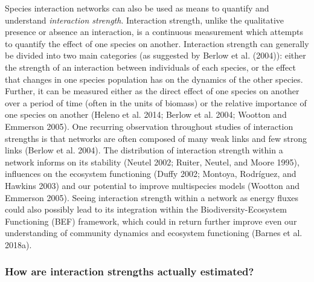 \documentclass[11pt]{article}
\begin{document}
Species interaction networks can also be used as means to quantify and
understand \emph{interaction strength}. Interaction strength, unlike the
qualitative presence or absence an interaction, is a continuous
measurement which attempts to quantify the effect of one species on
another. Interaction strength can generally be divided into two main
categories (as suggested by Berlow et al. (2004)): either the strength
of an interaction between individuals of each species, or the effect
that changes in one species population has on the dynamics of the other
species. Further, it can be measured either as the direct effect of one
species on another over a period of time (often in the units of biomass)
or the relative importance of one species on another (Heleno et al.
2014; Berlow et al. 2004; Wootton and Emmerson 2005). One recurring
observation throughout studies of interaction strengths is that networks
are often composed of many weak links and few strong links (Berlow et
al. 2004). The distribution of interaction strength within a network
informs on its stability (Neutel 2002; Ruiter, Neutel, and Moore 1995),
influences on the ecosystem functioning (Duffy 2002; Montoya, Rodríguez,
and Hawkins 2003) and our potential to improve multispecies models
(Wootton and Emmerson 2005). Seeing interaction strength within a
network as energy fluxes could also possibly lead to its integration
within the Biodiversity-Ecosystem Functioning (BEF) framework, which
could in return further improve even our understanding of community
dynamics and ecosystem functioning (Barnes et al. 2018a).

\hypertarget{how-are-interaction-strengths-actually-estimated}{%
\subsubsection{How are interaction strengths actually
estimated?}\label{how-are-interaction-strengths-actually-estimated}}
\end{document}
